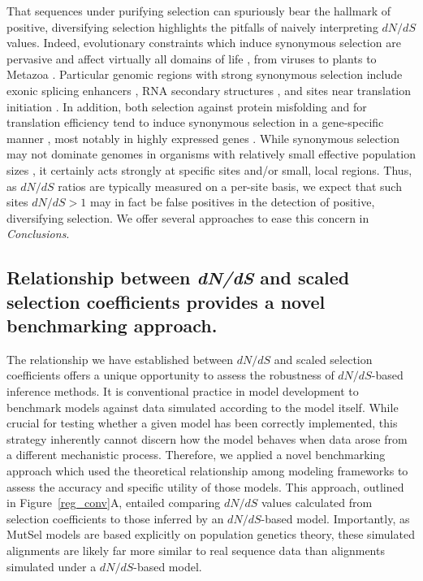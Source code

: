 \documentclass[11pt]{article}
\begin{document}
That sequences under purifying selection can spuriously bear the hallmark of positive, diversifying selection highlights the pitfalls of naively interpreting $dN/dS$ values. Indeed, evolutionary constraints which induce synonymous selection are pervasive and affect virtually all domains of life \cite{GuZhouWilke2010}, from viruses \cite{Cuevasetal2011,ZaniniNeher2013} to plants \cite{Guetal2012} to Metazoa \cite{Duret2002,Chamaryetal2006,HershbergPetrov2008,PlotkinKudla2010,Lawrieetal2013}. Particular genomic regions with strong synonymous selection include exonic splicing enhancers \cite{Schattner2006,Parmleyetal2006,ParmleyHurst2007}, RNA secondary structures \cite{Chamaryetal2005,Schattner2006,Cuevasetal2011,ZaniniNeher2013}, and sites near translation initiation \cite{GuZhouWilke2010}. In addition, both selection against protein misfolding and for translation efficiency tend to induce synonymous selection in a gene-specific manner \cite{WillifordDemuth2012,Agasheetal2013}, most notably in highly expressed genes \cite{DrummondWilke2008,Lawrieetal2013}. While synonymous selection may not dominate genomes in organisms with relatively small effective population sizes \cite{Chamaryetal2006, PlotkinKudla2010}, it certainly acts strongly at specific sites and/or small, local regions. Thus, as $dN/dS$ ratios are typically measured on a per-site basis, we expect that such sites $dN/dS > 1$ may in fact be false positives in the detection of positive, diversifying selection. We offer several approaches to ease this concern in \emph{Conclusions}.



\subsection*{Relationship between \emph{dN/dS} and scaled selection coefficients provides a novel benchmarking approach.}

The relationship we have established between $dN/dS$ and scaled selection coefficients offers a unique opportunity to assess the robustness of $dN/dS$-based inference methods. It is conventional practice in model development to benchmark models against data simulated according to the model itself. While crucial for testing whether a given model has been correctly implemented, this strategy inherently cannot discern how the model behaves when data arose from a different mechanistic process. Therefore, we applied a novel benchmarking approach which used the theoretical relationship among modeling frameworks to assess the accuracy and specific utility of those models. This approach, outlined in Figure~\ref{reg_conv}A, entailed comparing $dN/dS$ values calculated from selection coefficients to those inferred by an $dN/dS$-based model. Importantly, as MutSel models are based explicitly on population genetics theory, these simulated alignments are likely far more similar to real sequence data than alignments simulated under a $dN/dS$-based model.
\end{document}
